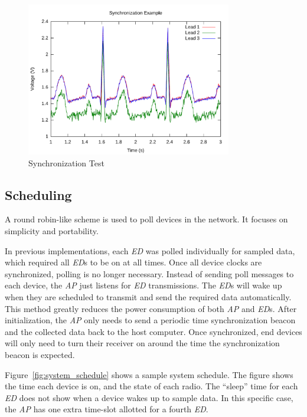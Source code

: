 \documentclass{article}
\begin{document}
\begin{figure}[htb]
\begin{center}
\includegraphics[width=0.8\textwidth]{figures/syncdata.pdf}
\end{center}
\caption{Synchronization Test}
\label{fig:sync_data}
\end{figure}

\subsection{Scheduling}
A round robin-like scheme is used to poll devices in the network. It focuses on simplicity and portability.

In previous implementations, each \emph{ED} was polled individually for sampled data, which required all \emph{ED}s to be on at all times. Once all device clocks are synchronized, polling is no longer necessary. Instead of sending poll messages to each device, the \emph{AP} just listens for \emph{ED} transmissions. The \emph{ED}s will wake up when they are scheduled to transmit and send the required data automatically. This method greatly reduces the power consumption of both \emph{AP} and \emph{ED}s. After initialization, the \emph{AP} only needs to send a periodic time synchronization beacon and the collected data back to the host computer. Once synchronized, end devices will only need to turn their receiver on around the time the synchronization beacon is expected.

Figure~\ref{fig:system_schedule} shows a sample system schedule. The figure shows the time each device is on, and the state of each radio. The ``sleep'' time for each \emph{ED} does not show when a device wakes up to sample data. In this specific case, the \emph{AP} has one extra time-slot allotted for a fourth \emph{ED}.
\end{document}
